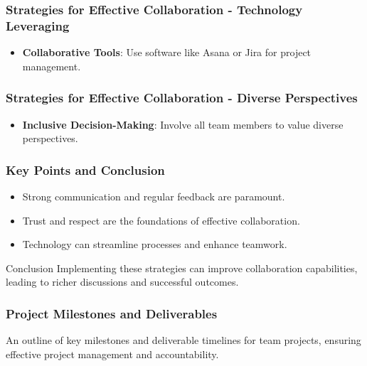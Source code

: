 \documentclass[aspectratio=169]{beamer}
\begin{document}
\begin{frame}[fragile]
    \frametitle{Strategies for Effective Collaboration - Technology Leveraging}
    \begin{itemize}
        \item \textbf{Collaborative Tools}: Use software like Asana or Jira for project management.
    \end{itemize}
\end{frame}

\begin{frame}[fragile]
    \frametitle{Strategies for Effective Collaboration - Diverse Perspectives}
    \begin{itemize}
        \item \textbf{Inclusive Decision-Making}: Involve all team members to value diverse perspectives.
    \end{itemize}
\end{frame}

\begin{frame}[fragile]
    \frametitle{Key Points and Conclusion}
    \begin{itemize}
        \item Strong communication and regular feedback are paramount.
        \item Trust and respect are the foundations of effective collaboration.
        \item Technology can streamline processes and enhance teamwork.
    \end{itemize}
    \begin{block}{Conclusion}
        Implementing these strategies can improve collaboration capabilities, leading to richer discussions and successful outcomes.
    \end{block}
\end{frame}

\begin{frame}[fragile]
    \frametitle{Project Milestones and Deliverables}
    An outline of key milestones and deliverable timelines for team projects, ensuring effective project management and accountability.
\end{frame}
\end{document}
